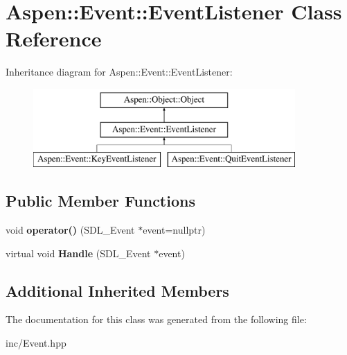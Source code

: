 \hypertarget{class_aspen_1_1_event_1_1_event_listener}{\section{Aspen\-:\-:Event\-:\-:Event\-Listener Class Reference}
\label{class_aspen_1_1_event_1_1_event_listener}
}
Inheritance diagram for Aspen\-:\-:Event\-:\-:Event\-Listener\-:\begin{figure}[H]
\begin{center}
\leavevmode
\includegraphics[height=3.000000cm]{d0/d1f/class_aspen_1_1_event_1_1_event_listener}
\end{center}
\end{figure}
\subsection*{Public Member Functions}
\begin{DoxyCompactItemize}
\item 
\hypertarget{class_aspen_1_1_event_1_1_event_listener_a06c80f778a67dbf5216384799f8c9a37}{void {\bfseries operator()} (S\-D\-L\-\_\-\-Event $\ast$event=nullptr)}\label{class_aspen_1_1_event_1_1_event_listener_a06c80f778a67dbf5216384799f8c9a37}

\item 
\hypertarget{class_aspen_1_1_event_1_1_event_listener_ae5c631c56d6086ea145e75c3b2a6da3e}{virtual void {\bfseries Handle} (S\-D\-L\-\_\-\-Event $\ast$event)}\label{class_aspen_1_1_event_1_1_event_listener_ae5c631c56d6086ea145e75c3b2a6da3e}

\end{DoxyCompactItemize}
\subsection*{Additional Inherited Members}


The documentation for this class was generated from the following file\-:\begin{DoxyCompactItemize}
\item 
inc/Event.\-hpp\end{DoxyCompactItemize}
